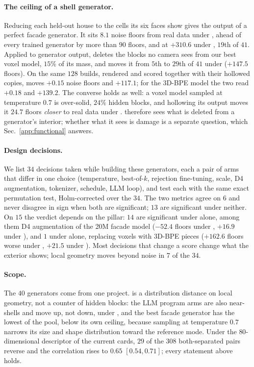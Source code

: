 \paragraph{The ceiling of a shell generator.} Reducing each held-out house to the cells its
six faces show gives the output of a perfect facade generator. It sits $8.1$ noise floors
from real data under \mvkid{}, ahead of every trained generator by more than $90$ floors,
and at $+310.6$ under \vkid{}, $19$th of $41$. Applied to generator output, \hollow{}
deletes the blocks no camera sees from our best voxel model, $15\%$ of its mass, and moves
it from $5$th to $29$th of $41$ under \vkid{} ($+147.5$ floors). On the same $128$ builds,
rendered and scored together with their hollowed copies, \mvkid{} moves $+0.15$ noise floors
and \vkid{} $+117.1$; for the 3D-BPE model the two read $+0.18$ and $+139.2$. The converse
holds as well: a voxel model sampled at temperature $0.7$ is over-solid, $24\%$ hidden
blocks, and hollowing its output moves it $24.7$ floors \emph{closer} to real data under
\vkid{}. \vkid{} therefore sees what is deleted from a generator's interior; whether what it
sees is damage is a separate question, which Sec.~\ref{app:functional} answers.

\paragraph{Design decisions.} We list $34$ decisions taken while building these generators,
each a pair of arms that differ in one choice (temperature, best-of-$k$, rejection
fine-tuning, scale, D4 augmentation, tokenizer, schedule, LLM loop), and test each with the
same exact permutation test, Holm-corrected over the $34$. The two metrics agree on $6$ and
never disagree in sign when both are significant; $13$ are significant under neither. On
$15$ the verdict depends on the pillar: $14$ are significant under \mvkid{} alone, among them
D4 augmentation of the 20M facade model ($-52.4$ floors under \mvkid{}, $+16.9$ under
\vkid{}), and $1$ under \vkid{} alone, replacing voxels with 3D-BPE pieces ($+162.6$ floors
worse under \vkid{}, $+21.5$ under \mvkid{}). Most decisions that change a score change
what the exterior shows; local geometry moves beyond noise in $7$ of the $34$.

\paragraph{Scope.} The $40$ generators come from one project. \vkid{} is a distribution
distance on local geometry, not a counter of hidden blocks: the LLM program arms are also
near-shells and move up, not down, under \vkid{}, and the best facade generator has the
lowest \vkid{} of the pool, below its own ceiling, because sampling at temperature $0.7$
narrows its size and shape distribution toward the reference mode. Under the
$80$-dimensional descriptor of the current cards, $29$ of the $308$ both-separated pairs
reverse and the correlation rises to $0.65$ $[0.54, 0.71]$; every statement above holds.

